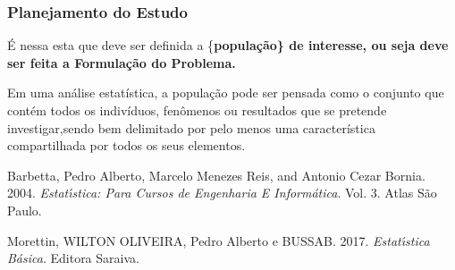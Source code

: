 \documentclass[
]{article}
\begin{document}
\hypertarget{planejamento-do-estudo}{%
\subsubsection{Planejamento do Estudo}\label{planejamento-do-estudo}}

É nessa esta que deve ser definida a \{\bf população\} de interesse, ou
seja deve ser feita a \textbf{Formulação do Problema}.

Em uma análise estatística, a população pode ser pensada como o conjunto
que contém todos os indivíduos, fenômenos ou resultados que se pretende
investigar,sendo bem delimitado por pelo menos uma característica
compartilhada por todos os seus elementos.

\hypertarget{refs}{}
\leavevmode\hypertarget{ref-barbetta2004}{}%
Barbetta, Pedro Alberto, Marcelo Menezes Reis, and Antonio Cezar Bornia.
2004. \emph{Estatı́stica: Para Cursos de Engenharia E Informática}. Vol.
3. Atlas São Paulo.

\leavevmode\hypertarget{ref-bussab}{}%
Morettin, WILTON OLIVEIRA, Pedro Alberto e BUSSAB. 2017.
\emph{Estatı́stica Básica}. Editora Saraiva.
\end{document}
